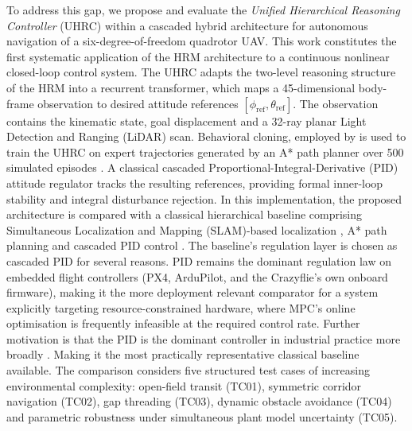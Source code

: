 \documentclass[12pt, a4paper]{article}
\begin{document}
To address this gap, we propose and evaluate the \textit{Unified Hierarchical Reasoning Controller} (UHRC) within a cascaded hybrid architecture for autonomous navigation of a six-degree-of-freedom quadrotor UAV.
This work constitutes the first systematic application of the HRM architecture to a continuous nonlinear closed-loop control system.
The UHRC adapts the two-level reasoning structure of the HRM into a recurrent transformer, which maps a 45-dimensional body-frame observation to desired attitude references $[\phi_{\mathrm{ref}}, \theta_{\mathrm{ref}}]$.
The observation contains the kinematic state, goal displacement and a 32-ray planar Light Detection and Ranging (LiDAR) scan.
Behavioral cloning, employed by\cite{levine_end--end_2016, le_mero_survey_2022, block_is_2024} is used to train the UHRC on expert trajectories generated by an A* path planner over 500 simulated episodes \parencite{lavalle_planning_2006, qin_review_2023}.
A classical cascaded Proportional-Integral-Derivative (PID) attitude regulator tracks the resulting references, providing formal inner-loop stability and integral disturbance rejection.
In this implementation, the proposed architecture is compared with a classical hierarchical baseline comprising Simultaneous Localization and Mapping (SLAM)-based localization \parencite{gupta_simultaneous_2022, milijas_comparison_2021}, A* path planning and cascaded PID control \parencite{bouabdallah_pid_2004, ren_cascade_2016, abdelhay_modeling_2019, lopez-sanchez_pid_2023}.
The baseline's regulation layer is chosen as cascaded PID for several reasons.
PID remains the dominant regulation law on
embedded flight controllers (PX4, ArduPilot, and the Crazyflie's own onboard firmware),
making it the more deployment relevant comparator for a system explicitly targeting
resource-constrained hardware, where MPC's online optimisation is frequently
infeasible at the required control rate. Further motivation is that the PID is the dominant
controller in industrial practice more broadly \parencite{astrom_pid_1995, astrom_future_2001}.
Making it the most practically representative classical baseline available. 
The comparison considers five structured test cases of increasing environmental complexity: open-field transit (TC01), symmetric corridor navigation (TC02), gap threading (TC03), dynamic obstacle avoidance (TC04) and parametric robustness under simultaneous plant model uncertainty (TC05).
\end{document}
